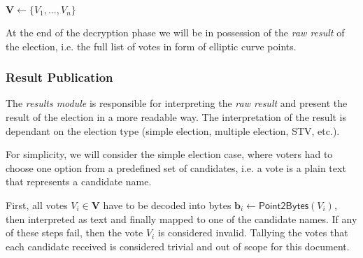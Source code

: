 \begin{algorithm}[!ht]
\DontPrintSemicolon
    \caption{$\mathsf{FinalizeDecryption} (\boldsymbol{e}, \boldsymbol{S}_1, ..., \boldsymbol{S}_{n_\mathrm{d}})$}
    
    $\boldsymbol{V} \gets \{ V_1, ..., V_n \}$ \;
    
     
    
    \label{alg: finalize decryption}
\end{algorithm}

At the end of the decryption phase we will be in possession of the \textit{raw result} of the election, i.e. the full list of votes in form of elliptic curve points.


\subsubsection{Result Publication} \label{sec: result publication}
The \textit{results module} is responsible for interpreting the \textit{raw result} and present the result of the election in a more readable way. The interpretation of the result is dependant on the election type (simple election, multiple election, STV, etc.).

For simplicity, we will consider the simple election case, where voters had to choose one option from a predefined set of candidates, i.e. a vote is a plain text that represents a candidate name.

First, all votes $V_i \in \boldsymbol{V}$ have to be decoded into bytes $\boldsymbol{b}_i \gets \mathsf{Point2Bytes}(V_i)$, then interpreted as text and finally mapped to one of the candidate names. If any of these steps fail, then the vote $V_i$ is considered invalid. Tallying the votes that each candidate received is considered trivial and out of scope for this document.


